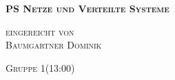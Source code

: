 \documentclass[12pt,a4paper]{report}
\begin{document}

\begin{titlepage}
	\begin{center}
		
		\vspace*{1.0cm}
		\huge
		\textsc{\bf{PS Netze und Verteilte Systeme}}
		
		\vspace*{4.0cm}
		\textsc{
			\normalsize{eingereicht von} \\[0.5\baselineskip]
			{\large Baumgartner Dominik}
		}
		
		\vspace*{3.0cm}
		\textsc{
			\normalsize{Gruppe 1(13:00)}
		}
		
	\end{center}
	
\end{titlepage}
\end{document}
